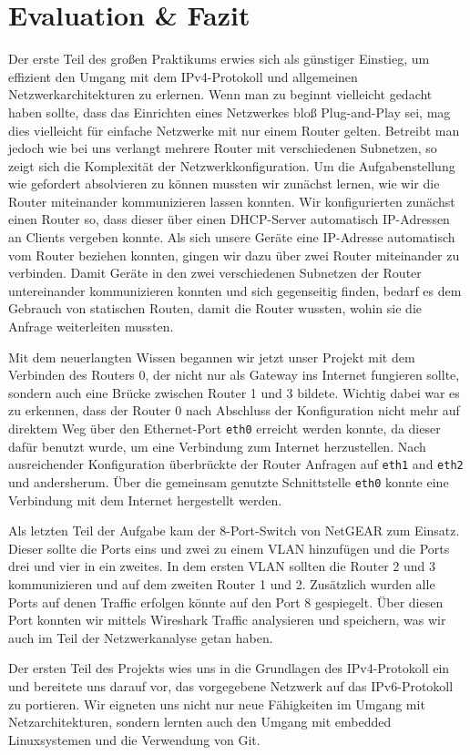 \documentclass[11pt,a4paper]{article}
\begin{document}
\section{Evaluation \& Fazit}
Der erste Teil des großen Praktikums erwies sich als günstiger
Einstieg, um effizient den Umgang mit dem IPv4-Protokoll und
allgemeinen Netzwerkarchitekturen zu erlernen. Wenn man zu beginnt
vielleicht gedacht haben sollte, dass das Einrichten eines Netzwerkes
bloß Plug-and-Play sei, mag dies vielleicht für einfache Netzwerke mit
nur einem Router gelten. Betreibt man jedoch wie bei uns verlangt
mehrere Router mit verschiedenen Subnetzen, so zeigt sich die
Komplexität der Netzwerkkonfiguration. Um die Aufgabenstellung wie
gefordert absolvieren zu können mussten wir zunächst lernen, wie wir
die Router miteinander kommunizieren lassen konnten. Wir
konfigurierten zunächst einen Router so, dass dieser über einen
DHCP-Server automatisch IP-Adressen an Clients vergeben konnte. Als
sich unsere Geräte eine IP-Adresse automatisch vom Router beziehen
konnten, gingen wir dazu über zwei Router miteinander zu verbinden.
Damit Geräte in den zwei verschiedenen Subnetzen der Router
untereinander kommunizieren konnten und sich gegenseitig finden,
bedarf es dem Gebrauch von statischen Routen, damit die Router
wussten, wohin sie die Anfrage weiterleiten mussten.
\par
Mit dem neuerlangten Wissen begannen wir jetzt unser Projekt mit dem
Verbinden des Routers 0, der nicht nur als Gateway ins Internet
fungieren sollte, sondern auch eine Brücke zwischen Router 1 und 3
bildete. Wichtig dabei war es zu erkennen, dass der Router 0 nach
Abschluss der Konfiguration nicht mehr auf direktem Weg über den
Ethernet-Port \texttt{eth0} erreicht werden konnte, da dieser dafür
benutzt wurde, um eine Verbindung zum Internet herzustellen.  Nach
ausreichender Konfiguration überbrückte der Router Anfragen auf
\texttt{eth1} and \texttt{eth2} und andersherum. Über die gemeinsam
genutzte Schnittstelle \texttt{eth0} konnte eine Verbindung mit dem
Internet hergestellt werden.
\par
Als letzten Teil der Aufgabe kam der 8-Port-Switch von NetGEAR zum
Einsatz. Dieser sollte die Ports eins und zwei zu einem VLAN
hinzufügen und die Ports drei und vier in ein zweites. In dem ersten
VLAN sollten die Router 2 und 3 kommunizieren und auf dem zweiten
Router 1 und 2. Zusätzlich wurden alle Ports auf denen Traffic
erfolgen könnte auf den Port 8 gespiegelt. Über diesen Port konnten
wir mittels Wireshark Traffic analysieren und speichern, was wir auch
im Teil der Netzwerkanalyse getan haben.
\par
Der ersten Teil des Projekts wies uns in die Grundlagen des
IPv4-Protokoll ein und bereitete uns darauf vor, das vorgegebene
Netzwerk auf das IPv6-Protokoll zu portieren. Wir eigneten uns nicht
nur neue Fähigkeiten im Umgang mit Netzarchitekturen, sondern lernten
auch den Umgang mit embedded Linuxsystemen und die Verwendung von Git.
\end{document}
